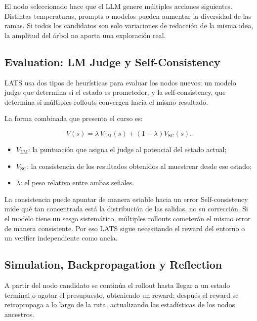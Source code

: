 El nodo seleccionado hace que el LLM genere múltiples acciones siguientes. Distintas temperaturas, prompts o modelos pueden aumentar la diversidad de las ramas. Si todos los candidatos son solo variaciones de redacción de la misma idea, la amplitud del árbol no aporta una exploración real.

\subsection{Evaluation: LM Judge y Self-Consistency}

LATS usa dos tipos de heurísticas para evaluar los nodos nuevos: un modelo judge que determina si el estado es prometedor, y la self-consistency, que determina si múltiples rollouts convergen hacia el mismo resultado.


La forma combinada que presenta el curso es:

$$
V(s)=\lambda\,V_{\mathrm{LM}}(s)+(1-\lambda)V_{\mathrm{SC}}(s).
$$

\begin{itemize}
    \item $V_{\mathrm{LM}}$: la puntuación que asigna el judge al potencial del estado actual;
    \item $V_{\mathrm{SC}}$: la consistencia de los resultados obtenidos al muestrear desde ese estado;
    \item $\lambda$: el peso relativo entre ambas señales.
\end{itemize}

\begin{warningbox}{La consistencia puede apuntar de manera estable hacia un error}
Self-consistency mide qué tan concentrada está la distribución de las salidas, no su corrección. Si el modelo tiene un sesgo sistemático, múltiples rollouts cometerán el mismo error de manera consistente. Por eso LATS sigue necesitando el reward del entorno o un verifier independiente como ancla.
\end{warningbox}

\subsection{Simulation, Backpropagation y Reflection}

A partir del nodo candidato se continúa el rollout hasta llegar a un estado terminal o agotar el presupuesto, obteniendo un reward; después el reward se retropropaga a lo largo de la ruta, actualizando las estadísticas de los nodos ancestros.

